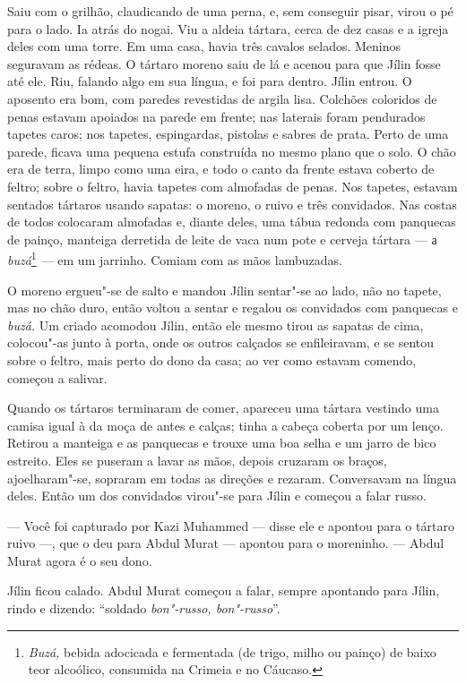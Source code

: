 Saiu com o grilhão, claudicando de uma perna, e, sem conseguir pisar,
virou o pé para o lado. Ia atrás do nogai. Viu a aldeia tártara, cerca
de dez casas e a igreja deles com uma torre. Em uma casa, havia três
cavalos selados. Meninos seguravam as rédeas. O tártaro moreno saiu de
lá e acenou para que Jílin fosse até ele. Riu, falando algo em sua
língua, e foi para dentro. Jílin entrou. O aposento era bom, com paredes
revestidas de argila lisa. Colchões coloridos de penas estavam apoiados
na parede em frente; nas laterais foram pendurados tapetes caros; nos
tapetes, espingardas, pistolas e sabres de prata. Perto de uma parede,
ficava uma pequena estufa construída no mesmo plano que o solo. O chão
era de terra, limpo como uma eira, e todo o canto da frente estava
coberto de feltro; sobre o feltro, havia tapetes com almofadas de penas.
Nos tapetes, estavam sentados tártaros usando sapatas: o moreno, o ruivo
e três convidados. Nas costas de todos colocaram almofadas e, diante
deles, uma tábua redonda com panquecas de painço, manteiga derretida de
leite de vaca num pote e cerveja tártara --- а \emph{buzá}\footnote{\emph{Buzá,}
  bebida adocicada e fermentada (de trigo, milho ou painço) de baixo
  teor alcoólico, consumida na Crimeia e no Cáucaso.} \emph{---} em um
jarrinho. Comiam com as mãos lambuzadas.

O moreno ergueu"-se de salto e mandou Jílin sentar"-se ao lado, não no
tapete, mas no chão duro, então voltou a sentar e regalou os convidados
com panquecas e \emph{buzá.} Um criado acomodou Jílin, então ele mesmo
tirou as sapatas de cima, colocou"-as junto à porta, onde os outros
calçados se enfileiravam, e se sentou sobre o feltro, mais perto do dono
da casa; ao ver como estavam comendo, começou a salivar.

Quando os tártaros terminaram de comer, apareceu uma tártara vestindo
uma camisa igual à da moça de antes e calças; tinha a cabeça coberta por
um lenço. Retirou a manteiga e as panquecas e trouxe uma boa selha e um
jarro de bico estreito. Eles se puseram a lavar as mãos, depois cruzaram
os braços, ajoelharam"-se, sopraram em todas as direções e rezaram.
Conversavam na língua deles. Então um dos convidados virou"-se para Jílin
e começou a falar russo.

--- Você foi capturado por Kazi Muhammed --- disse ele e apontou para o
tártaro ruivo ---, que o deu para Abdul Murat --- apontou para o
moreninho. --- Abdul Murat agora é o seu dono.

Jílin ficou calado. Abdul Murat começou a falar, sempre apontando para
Jílin, rindo e dizendo: ``soldado \emph{bon"-russo, bon"-russo}''.

